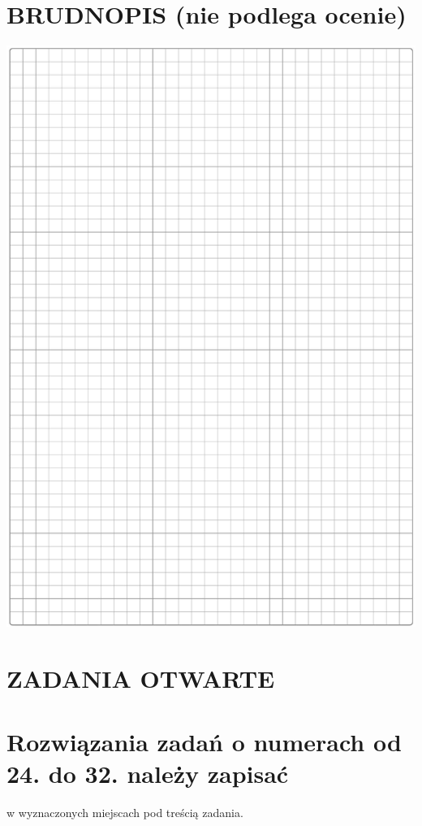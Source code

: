 \documentclass[10pt]{article}
\begin{document}
\section*{BRUDNOPIS (nie podlega ocenie)}
\begin{center}
\includegraphics[max width=\textwidth]{2024_11_21_a38d702bc7be8115942cg-07}
\end{center}

\section*{ZADANIA OTWARTE}
\section*{Rozwiązania zadań o numerach od 24. do 32. należy zapisać}
w wyznaczonych miejscach pod treścią zadania.
\end{document}
